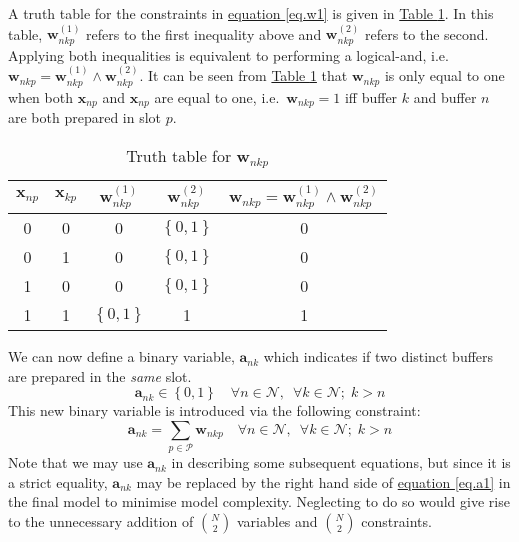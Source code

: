 A truth table for the constraints in 
\hyperref[eq.w1]{equation \ref*{eq.w1}} is given in
\hyperref[tbl.truthw]{Table \ref*{tbl.truthw}}.
In this table, $\boldsymbol{w}_{nkp}^{\left( 1 \right)}$ refers to the first
inequality above and $\boldsymbol{w}_{nkp}^{\left( 2 \right)}$ refers to the
second.
Applying both inequalities is equivalent to performing a logical-and, i.e.\
$\boldsymbol{w}_{nkp} = \boldsymbol{w}_{nkp}^{\left( 1 \right)} \land
\boldsymbol{w}_{nkp}^{\left( 2 \right)}$.
It can be seen from \hyperref[tbl.truthw]{Table \ref*{tbl.truthw}} that 
$\boldsymbol{w}_{nkp}$ is only equal to one when both $\boldsymbol{x}_{np}$ and
$\boldsymbol{x}_{np}$ are equal to one, i.e.\ $\boldsymbol{w}_{nkp} = 1$ iff
buffer $k$ and buffer $n$ are both prepared in slot $p$.
\begin{table}[h!]
    \centering
    \caption{Truth table for $\boldsymbol{w}_{nkp}$}
    \label{tbl.truthw}
    \begin{tabular}{c c | c c | c}
        $\boldsymbol{x}_{np}$ & $\boldsymbol{x}_{kp}$ &
        $\boldsymbol{w}_{nkp}^{\left( 1 \right)}$ &
        $\boldsymbol{w}_{nkp}^{\left( 2 \right)}$ &
        $\boldsymbol{w}_{nkp} = \boldsymbol{w}_{nkp}^{\left( 1 \right)}
            \land \boldsymbol{w}_{nkp}^{\left( 2 \right)}
        $\\ \hline
        0 & 0 & 0 & $\left\{ 0,1 \right\}$ & 0\\
        0 & 1 & 0 & $\left\{ 0,1 \right\}$ & 0\\
        1 & 0 & 0 & $\left\{ 0,1 \right\}$ & 0\\
        1 & 1 & $\left\{ 0,1 \right\}$ & 1 & 1\\
    \end{tabular}
\end{table}

We can now define a binary variable, $\boldsymbol{a}_{nk}$ which indicates if
two distinct buffers are prepared in the \emph{same} slot.
\begin{equation}
    \boldsymbol{a}_{nk} \in \left\{ 0, 1 \right\} \quad \forall n \in
    \mathcal{N}, \enspace \forall k \in \mathcal{N}; \; k > n
    \label{eq.a}
\end{equation}
This new binary variable is introduced via the following constraint:
\begin{equation}
    \boldsymbol{a}_{nk} = \sum_{p \in \mathcal{P}} \boldsymbol{w}_{nkp} \quad
    \forall n \in \mathcal{N}, \enspace \forall k \in \mathcal{N}; \; k > n
    \label{eq.a1}
\end{equation}
Note that we may use $\boldsymbol{a}_{nk}$ in describing some subsequent
equations, but since it is a strict equality, $\boldsymbol{a}_{nk}$ may be 
replaced by the right hand side of \hyperref[eq.a1]{equation \ref*{eq.a1}} in the
final model to minimise model complexity.
Neglecting to do so would give rise to the unnecessary addition of
$\binom{N}{2}$ variables and $\binom{N}{2}$ constraints.

